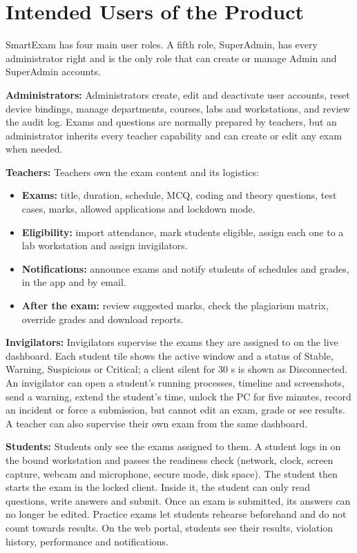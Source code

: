 \section{Intended Users of the Product}

SmartExam has four main user roles. A fifth role, SuperAdmin, has every administrator right and is the only role that can create or manage Admin and SuperAdmin accounts.

\textbf{Administrators:} Administrators create, edit and deactivate user accounts, reset device bindings, manage departments, courses, labs and workstations, and review the audit log. Exams and questions are normally prepared by teachers, but an administrator inherits every teacher capability and can create or edit any exam when needed.

\textbf{Teachers:} Teachers own the exam content and its logistics:
\begin{itemize}[noitemsep]
\item \textbf{Exams:} title, duration, schedule, MCQ, coding and theory questions, test cases, marks, allowed applications and lockdown mode.
\item \textbf{Eligibility:} import attendance, mark students eligible, assign each one to a lab workstation and assign invigilators.
\item \textbf{Notifications:} announce exams and notify students of schedules and grades, in the app and by email.
\item \textbf{After the exam:} review suggested marks, check the plagiarism matrix, override grades and download reports.
\end{itemize}

\textbf{Invigilators:} Invigilators supervise the exams they are assigned to on the live dashboard. Each student tile shows the active window and a status of Stable, Warning, Suspicious or Critical; a client silent for 30 s is shown as Disconnected. An invigilator can open a student's running processes, timeline and screenshots, send a warning, extend the student's time, unlock the PC for five minutes, record an incident or force a submission, but cannot edit an exam, grade or see results. A teacher can also supervise their own exam from the same dashboard.

\textbf{Students:} Students only see the exams assigned to them. A student logs in on the bound workstation and passes the readiness check (network, clock, screen capture, webcam and microphone, secure mode, disk space). The student then starts the exam in the locked client. Inside it, the student can only read questions, write answers and submit. Once an exam is submitted, its answers can no longer be edited. Practice exams let students rehearse beforehand and do not count towards results. On the web portal, students see their results, violation history, performance and notifications.

